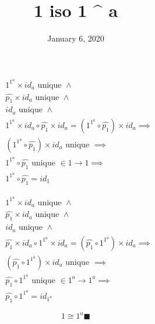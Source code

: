 \documentclass[fleqn, 11pt]{article}
\date{January 6, 2020}
\title{1 iso 1 ^ a}
\begin{document}

\begin{equation}
\tag{from}
\begin{aligned}
& 1^{1^a} \times id_a \text{ unique } \land \\
& \widehat{p_1} \times id_a \text{ unique } \land \\
& id_a \text{ unique } \land \\
& 1^{1^a} \times id_a \circ \widehat{p_1} \times id_a =
  (1^{1^a} \circ \widehat{p_1}) \times id_a \implies \\
& (1^{1^a} \circ \widehat{p_1}) \times id_a \text{ unique }
  \implies \\
& 1^{1^a} \circ \widehat{p_1} \text{ unique } \in 1 \rightarrow 1
  \implies \\
& 1^{1^a} \circ \widehat{p_1} = id_1
\end{aligned}
\end{equation}

\begin{equation}
\tag{to}
\begin{aligned}
& 1^{1^a} \times id_a \text{ unique } \land \\
& \widehat{p_1} \times id_a \text{ unique } \land \\
& id_a \text{ unique } \land \\
& \widehat{p_1} \times id_a \circ 1^{1^a} \times id_a =
  (\widehat{p_1} \circ 1^{1^a}) \times id_a \implies \\
& (\widehat{p_1} \circ 1^{1^a}) \times id_a \text{ unique } \implies \\
& \widehat{p_1} \circ 1^{1^a} \text{ unique } \in 
  1^a \rightarrow 1^a \implies \\
& \widehat{p_1} \circ 1^{1^a} = id_{1^a}
\end{aligned}
\end{equation}

\hrulefill

$$ 1 \cong 1^a \blacksquare $$
\end{document}
